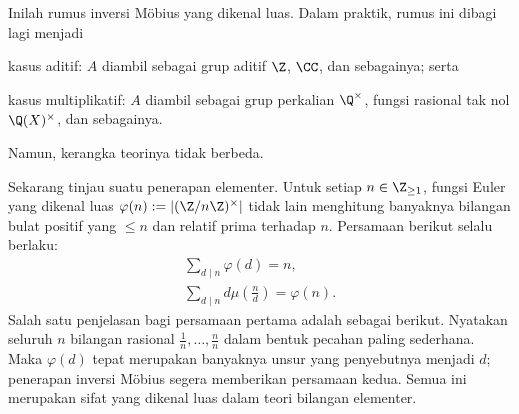 \begin{example}[A.\ F.\ Möbius, 1832]
	Inilah rumus inversi Möbius yang dikenal luas. Dalam praktik, rumus ini dibagi lagi menjadi
	\begin{inparaenum}[(a)]
		\item kasus aditif: $A$ diambil sebagai grup aditif $\Z$, $\CC$, dan sebagainya; serta
		\item kasus multiplikatif: $A$ diambil sebagai grup perkalian $\Q^\times$, fungsi rasional tak nol $\Q(X)^\times$, dan sebagainya.
	\end{inparaenum}
	Namun, kerangka teorinya tidak berbeda.
\end{example}

Sekarang tinjau suatu penerapan elementer. Untuk setiap $n \in \Z_{\geq 1}$, fungsi Euler yang dikenal luas $\varphi(n) := |(\Z/n\Z)^\times|$ tidak lain menghitung banyaknya bilangan bulat positif yang $\leq n$ dan relatif prima terhadap $n$. Persamaan berikut selalu berlaku:
\begin{equation}\label{eqn:Euler-phi-sum}\begin{gathered}
	\sum_{d \mid n} \varphi(d) = n, \\
	\sum_{d \mid n} d \mu\left( \frac{n}{d} \right) = \varphi(n).
\end{gathered}\end{equation}
Salah satu penjelasan bagi persamaan pertama adalah sebagai berikut. Nyatakan seluruh $n$ bilangan rasional $\frac{1}{n}, \ldots, \frac{n}{n}$ dalam bentuk pecahan paling sederhana. Maka $\varphi(d)$ tepat merupakan banyaknya unsur yang penyebutnya menjadi $d$; penerapan inversi Möbius segera memberikan persamaan kedua. Semua ini merupakan sifat yang dikenal luas dalam teori bilangan elementer.
